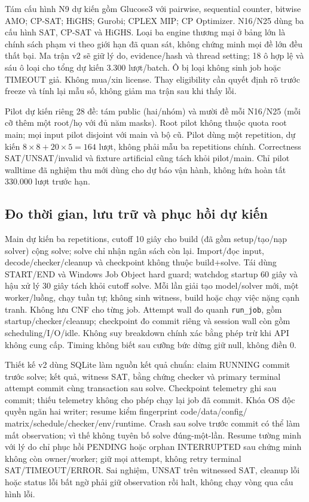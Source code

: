 Tám cấu hình N9 dự kiến gồm Glucose3 với pairwise, sequential counter,
bitwise AMO; CP-SAT; HiGHS; Gurobi; CPLEX MIP; CP Optimizer.
N16/N25 dùng ba cấu hình SAT, CP-SAT và HiGHS. Loại ba engine thương mại ở
bảng lớn là chính sách phạm vi theo giới hạn đã quan sát, không chứng minh
mọi đề lớn đều thất bại. Ma trận v2 sẽ giữ lý do, evidence/hash và thread setting;
18 ô hợp lệ và sáu ô loại cho tổng dự kiến 3.300 lượt/batch.
Ô bị loại không sinh job hoặc TIMEOUT giả. Không mua/xin license.
Thay eligibility cần quyết định rõ trước freeze và tính lại mẫu số, không giảm
ma trận sau khi thấy lỗi.

Pilot dự kiến riêng 28 đề: tám public (hai/nhóm) và mười đề mỗi N16/N25
(mỗi cỡ thêm một root/họ với đủ năm masks). Root pilot không thuộc quota root
main; mọi input pilot disjoint với main và bộ cũ. Pilot dùng một repetition,
dự kiến $8\times8+20\times5=164$ lượt, không phải mẫu ba repetitions chính.
Correctness SAT/UNSAT/invalid và fixture artificial cũng tách khỏi pilot/main.
Chỉ pilot walltime đã nghiệm thu mới dùng cho dự báo vận hành, không hứa
hoàn tất 330.000 lượt trước hạn.

\subsection{Đo thời gian, lưu trữ và phục hồi dự kiến}
Main dự kiến ba repetitions, cutoff 10 giây cho build (đã gồm setup/tạo/nạp
solver) cộng solve; solve chỉ nhận ngân sách còn lại. Import/đọc input,
decode/checker/cleanup và checkpoint không thuộc build+solve.
Tái dùng START/END và Windows Job Object hard guard; watchdog startup 60 giây
và hậu xử lý 30 giây tách khỏi cutoff solve. Mỗi lần giải tạo model/solver mới,
một worker/luồng, chạy tuần tự; không sinh witness, build hoặc chạy việc nặng
cạnh tranh. Không lưu CNF cho từng job.
Attempt wall đo quanh \texttt{run\_job}, gồm startup/checker/cleanup;
checkpoint đo commit riêng và session wall còn gồm scheduling/I/O/idle.
Không suy breakdown chính xác bằng phép trừ khi API không cung cấp.
Timing không biết sau cưỡng bức dừng giữ null, không điền 0.

Thiết kế v2 dùng SQLite làm nguồn kết quả chuẩn: claim RUNNING commit trước
solve; kết quả, witness SAT, bằng chứng checker và primary terminal attempt
commit cùng transaction sau solve. Checkpoint telemetry ghi sau commit;
thiếu telemetry không cho phép chạy lại job đã commit.
Khóa OS độc quyền ngăn hai writer; resume kiểm fingerprint code/data/config/
matrix/schedule/checker/env/runtime. Crash sau solve trước commit có thể làm
mất observation; vì thế không tuyên bố solve đúng-một-lần. Resume tường minh
với lý do chỉ phục hồi PENDING hoặc orphan INTERRUPTED sau chứng minh không
còn owner/worker; giữ mọi attempt, không retry terminal SAT/TIMEOUT/ERROR.
Sai nghiệm, UNSAT trên witnessed SAT, cleanup lỗi hoặc status lỗi bất ngờ
phải giữ observation rồi halt, không chạy vòng qua cấu hình lỗi.


